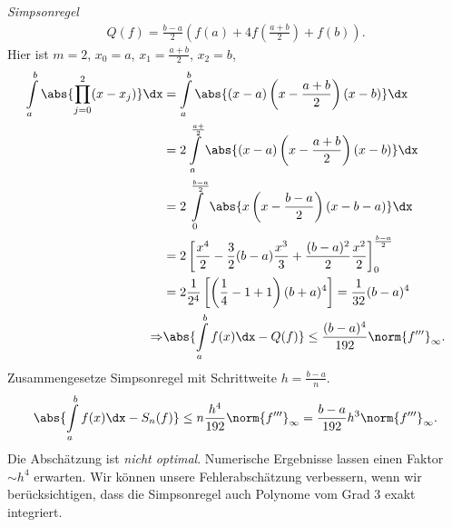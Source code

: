 \begin{bspn}
\textit{Simpsonregel}
\begin{align*}
Q(f) = \frac{b-a}{2}\left(f(a) + 4f\left(\frac{a+b}{2}\right) + f(b) \right).
\end{align*}
Hier ist $m=2$, $x_0=a$, $x_1 = \frac{a+b}{2}$, $x_2 =b$,
\begin{align*}
\int\limits_a^b \abs{\prod\limits_{j=0}^2 (x-x_j)}\dx 
&= \int\limits_a^b \abs{(x-a)\left(x-\frac{a+b}{2}\right)(x-b)}\dx\\
&= 2\int\limits_a^{\frac{a+}{2}}
\abs{(x-a)\left(x-\frac{a+b}{2}\right)(x-b)}\dx\\
&= 2\int\limits_0^{\frac{b-a}{2}}
\abs{x\left(x-\frac{b-a}{2}\right)\left(x-b-a\right)}\dx \\
&=2\left[\frac{x^4}{2}-\frac{3}{2}(b-a)\frac{x^3}{3} +
\frac{(b-a)^2}{2}\frac{x^2}{2} \right]_{0}^{\frac{b-a}{2}}\\
&= 2\frac{1}{2^4}\left[\left(\frac{1}{4} - 1 + 1\right)(b+a)^4 \right] =
\frac{1}{32}(b-a)^4\\
\Rightarrow & \abs{\int\limits_a^b f(x)\dx -Q(f)} \le
\frac{(b-a)^4}{192}\norm{f'''}_\infty.
\end{align*}
Zusammengesetze Simpsonregel mit Schrittweite $h=\frac{b-a}{n}$.
\begin{align*}
\abs{\int\limits_a^b f(x)\dx - S_n(f)} \le n \frac{h^4}{192}\norm{f'''}_\infty
= \frac{b-a}{192}h^3\norm{f'''}_\infty.
\end{align*}
Die Abschätzung ist \textit{nicht optimal}. Numerische Ergebnisse lassen
einen Faktor $\sim h^4$ erwarten. Wir können unsere Fehlerabschätzung
verbessern, wenn wir berücksichtigen, dass die Simpsonregel auch Polynome vom
Grad 3 exakt integriert.\bsphere
\end{bspn}

